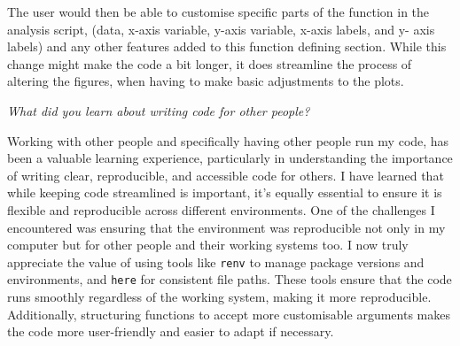 \documentclass[
]{article}
\begin{document}
The user would then be able to customise specific parts of the function
in the analysis script, (data, x-axis variable, y-axis variable, x-axis
labels, and y- axis labels) and any other features added to this
function defining section. While this change might make the code a bit
longer, it does streamline the process of altering the figures, when
having to make basic adjustments to the plots.

\emph{What did you learn about writing code for other people?}

Working with other people and specifically having other people run my
code, has been a valuable learning experience, particularly in
understanding the importance of writing clear, reproducible, and
accessible code for others. I have learned that while keeping code
streamlined is important, it's equally essential to ensure it is
flexible and reproducible across different environments. One of the
challenges I encountered was ensuring that the environment was
reproducible not only in my computer but for other people and their
working systems too. I now truly appreciate the value of using tools
like \texttt{renv} to manage package versions and environments, and
\texttt{here} for consistent file paths. These tools ensure that the
code runs smoothly regardless of the working system, making it more
reproducible. Additionally, structuring functions to accept more
customisable arguments makes the code more user-friendly and easier to
adapt if necessary.
\end{document}
